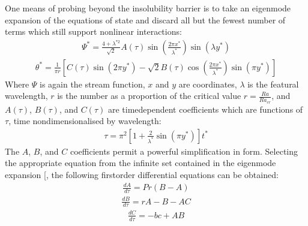 \documentclass[letterpaper,10pt,english]{jupyterBook}
\begin{document}
\sphinxAtStartPar
One means of probing beyond the insolubility barrier is to take an eigenmode expansion of the equations of state and discard all but the fewest number of terms which still support nonlinear interactions:
\begin{equation*}
\begin{split} \Psi^* = \frac{4 + \lambda^{*2}}{\sqrt{2}} A(\tau) \sin \left( \frac{2 \pi x^*}{\lambda^*} \right) \sin \left( \lambda y^* \right) \end{split}
\end{equation*}\begin{equation*}
\begin{split} \theta^* = \frac{1}{\pi r} \left[ C(\tau) \sin \left( 2 \pi y^* \right) - \sqrt{2} B(\tau) \cos \left( \frac{2 \pi x^*}{\lambda^*} \right) \sin \left( \pi y^* \right) \right] \end{split}
\end{equation*}
\sphinxAtStartPar
Where \(\Psi\) is again the stream function, \(x\) and \(y\) are coordinates, \(\lambda\) is the featural wavelength, \(r\) is the  number as a proportion of the critical value \(r = \frac{Ra}{Ra_{cr}}\), and \(A(\tau)\), \(B(\tau)\), and \(C(\tau)\) are time\sphinxhyphen{}dependent coefficients which are functions of \(\tau\), time non\sphinxhyphen{}dimensionalised by wavelength:
\begin{equation*}
\begin{split} \tau = \pi^2 \left[ 1 + \frac{2}{\lambda^*} \sin \left( \pi y^* \right) \right] t^* \end{split}
\end{equation*}
\sphinxAtStartPar
The \(A\), \(B\), and \(C\) coefficients permit a powerful simplification in form. Selecting the appropriate equation from the infinite set contained in the eigenmode expansion {[}\sphinxcite{references:id89}{]}, the following first\sphinxhyphen{}order differential equations can be obtained:
\begin{equation*}
\begin{split} \frac{d A}{d \tau} = Pr \left( B - A \right) \end{split}
\end{equation*}\begin{equation*}
\begin{split} \frac{d B}{d \tau} = rA - B - AC \end{split}
\end{equation*}\begin{equation*}
\begin{split} \frac{d C}{d \tau} = -bc + AB \end{split}
\end{equation*}
\end{document}
